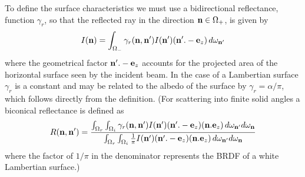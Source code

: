 To define the surface characteristics we must use a bidirectional reflectance,
function $\gamma_r$, so that the reflected ray in the direction $\mathbf{n} \in 
\Omega_+$, is given by
\begin{equation}
I(\mathbf{n})=\int_{\Omega_-} \gamma_r(\mathbf{n},\mathbf{n}') I(\mathbf{n}') (\mathbf{n}' . -\mathbf{e}_z) \,
d\omega_{\mathbf{n}'}
\end{equation}
where the geometrical factor $\mathbf{n}' . -\mathbf{e}_z$ accounts for the
projected area of the horizontal surface seen by the incident beam.
In the case of a Lambertian surface $\gamma_r$ is a constant and may be 
related to the albedo of the surface by $\gamma_r=\alpha/\pi$, which follows 
directly from the definition. (For scattering into finite solid angles a
biconical reflectance is defined as
\begin{equation}
R(\mathbf{n}, \mathbf{n}')= { {\int_{\Omega_r} \int_{\Omega_i} \gamma_r(\mathbf{n},\mathbf{n}') I(\mathbf{n}')
(\mathbf{n}' . -\mathbf{e}_z) (\mathbf{n} . \mathbf{e}_z) \, d\omega_{\mathbf{n}'} 
d\omega_{\mathbf{n}} } \over { \int_{\Omega_r} \int_{\Omega_i} {1\over \pi} I(\mathbf{n}')
(\mathbf{n}'. -\mathbf{e}_z) (\mathbf{n}. \mathbf{e}_z) \, d\omega_{\mathbf{n}'}
d\omega_{\mathbf{n}} } }
\end{equation}
where the factor of $1/\pi$ in the denominator represents the BRDF of a
white Lambertian surface.)


